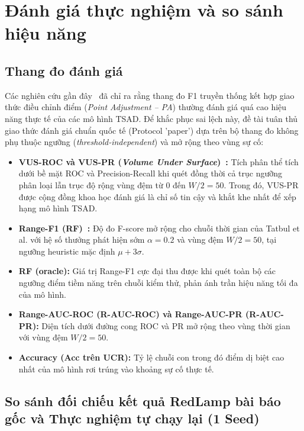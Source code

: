 \documentclass[sigconf,nonacm]{acmart}
\begin{document}
\section{Đánh giá thực nghiệm và so sánh hiệu năng}

\subsection{Thang đo đánh giá}

Các nghiên cứu gần đây~\cite{kim2022, sarfraz2024} đã chỉ ra rằng thang đo F1 truyền thống kết hợp giao thức điều chỉnh điểm (\textit{Point Adjustment -- PA}) thường đánh giá quá cao hiệu năng thực tế của các mô hình TSAD. Để khắc phục sai lệch này, đề tài tuân thủ giao thức đánh giá chuẩn quốc tế (Protocol 'paper') dựa trên bộ thang đo không phụ thuộc ngưỡng (\textit{threshold-independent}) và mở rộng theo vùng sự cố:
\begin{itemize}[leftmargin=*, itemsep=2pt, parsep=0pt]
    \item \textbf{VUS-ROC và VUS-PR (\textit{Volume Under Surface})~\cite{paparrizos2022}:} Tích phân thể tích dưới bề mặt ROC và Precision-Recall khi quét đồng thời cả trục ngưỡng phân loại lẫn trục độ rộng vùng đệm từ $0$ đến $W/2 = 50$. Trong đó, VUS-PR được cộng đồng khoa học đánh giá là chỉ số tin cậy và khắt khe nhất để xếp hạng mô hình TSAD.
    \item \textbf{Range-F1 (RF)~\cite{tatbul2018}:} Độ đo F-score mở rộng cho chuỗi thời gian của Tatbul et al. với hệ số thưởng phát hiện sớm $\alpha = 0.2$ và vùng đệm $W/2=50$, tại ngưỡng heuristic mặc định $\mu + 3\sigma$.
    \item \textbf{RF (oracle):} Giá trị Range-F1 cực đại thu được khi quét toàn bộ các ngưỡng điểm tiềm năng trên chuỗi kiểm thử, phản ánh trần hiệu năng tối đa của mô hình.
    \item \textbf{Range-AUC-ROC (R-AUC-ROC) và Range-AUC-PR (R-AUC-PR):} Diện tích dưới đường cong ROC và PR mở rộng theo vùng thời gian với vùng đệm $W/2=50$.
    \item \textbf{Accuracy (Acc trên UCR):} Tỷ lệ chuỗi con trong đó điểm dị biệt cao nhất của mô hình rơi trúng vào khoảng sự cố thực tế.
\end{itemize}

\subsection{So sánh đối chiếu kết quả RedLamp bài báo gốc và Thực nghiệm tự chạy lại (1 Seed)}
\end{document}

